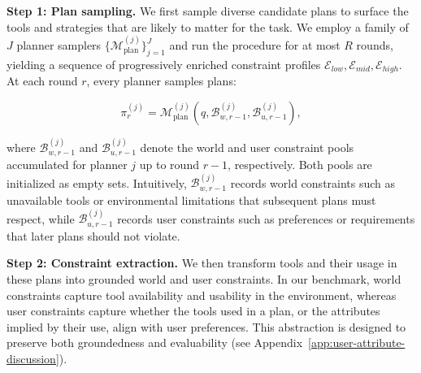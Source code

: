\noindent\textbf{Step 1: Plan sampling.}
We first sample diverse candidate plans to surface the tools and strategies that are likely to matter for the task.
We employ a family of $J$ planner samplers {\small $\{\mathcal{M}^{(j)}_{\mathrm{plan}}\}_{j=1}^{J}$} and run the procedure for at most $R$ rounds, yielding a sequence of progressively enriched constraint profiles $\mathcal{E}_{low}, \mathcal{E}_{mid}, \mathcal{E}_{high}$. At each round $r$, every planner samples plans:
\begin{footnotesize}
\begin{equation}
\pi^{(j)}_{r} = \mathcal{M}^{(j)}_{\mathrm{plan}}\!\left(q,\mathcal{B}^{(j)}_{w,r-1},\mathcal{B}^{(j)}_{u,r-1}\right),
\end{equation}
\end{footnotesize}
where {\small $\mathcal{B}^{(j)}_{w,r-1}$} and {\small $\mathcal{B}^{(j)}_{u,r-1}$} denote the world and user constraint pools accumulated for planner $j$ up to round $r-1$, respectively. Both pools are initialized as empty sets. Intuitively, {\small $\mathcal{B}^{(j)}_{w,r-1}$} records world constraints such as unavailable tools or environmental limitations that subsequent plans must respect, while {\small $\mathcal{B}^{(j)}_{u,r-1}$} records user constraints such as preferences or requirements that later plans should not violate.

\noindent\textbf{Step 2: Constraint extraction.}
We then transform tools and their usage in these plans into grounded world and user constraints.
In our benchmark, world constraints capture tool availability and usability in the environment, whereas user constraints capture whether the tools used in a plan, or the attributes implied by their use, align with user preferences. This abstraction is designed to preserve both groundedness and evaluability (see Appendix~\ref{app:user-attribute-discussion}).

